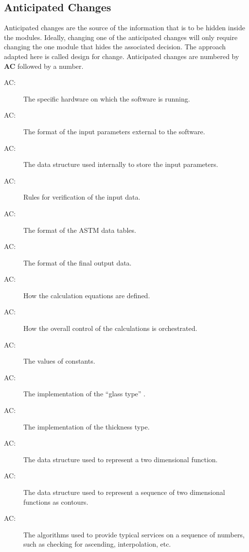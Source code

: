 \documentclass[12pt]{article}
\newcounter{acnum}
\newcommand{\actheacnum}{AC\theacnum}
\begin{document}
\subsection{Anticipated Changes} \label{SecAchange}

Anticipated changes are the source of the information that is to be hidden
inside the modules. Ideally, changing one of the anticipated changes will only
require changing the one module that hides the associated decision. The approach
adapted here is called design for
change. Anticipated changes are numbered by \textbf{AC} followed by a number.

\begin{description}

\item[ \actheacnum \label{acHardware}:] The specific
  hardware on which the software is running.
\item[ \actheacnum \label{acInputFormat}:] The format of the
  input parameters external to the software.
\item[ \actheacnum \label{acParamsStruct}:] The data structure
  used internally to store the input parameters.
\item[ \actheacnum \label{acVerific}:] Rules for
  verification of the input data.
\item[ \actheacnum \label{acInASTMFormat}:] The format of the
  ASTM data tables.
\item[ \actheacnum \label{acOutput}:] The format of the
  final output data.
\item[ \actheacnum \label{acCalc}:] How the calculation
  equations are defined.
\item[ \actheacnum \label{acControl}:] How the overall
  control of the calculations is orchestrated.
\item[ \actheacnum \label{acConstants}:] The values of
  constants.
\item[ \actheacnum \label{acGlassType}:] The
  implementation of the ``glass type'' .\\
\item[ \actheacnum \label{acThickness}:] The
  implementation of the thickness type.
\item[ \actheacnum \label{acFuncts}:] The data structure
  used to represent a two dimensional function.
\item[ \actheacnum \label{acContours}:] The data structure used
  to represent a sequence of two dimensional functions as contours.
\item[ \actheacnum \label{acSeqServices}:] The algorithms
  used to provide typical services on a sequence of numbers, such as checking
  for ascending, interpolation, etc.


\end{description}
\end{document}
